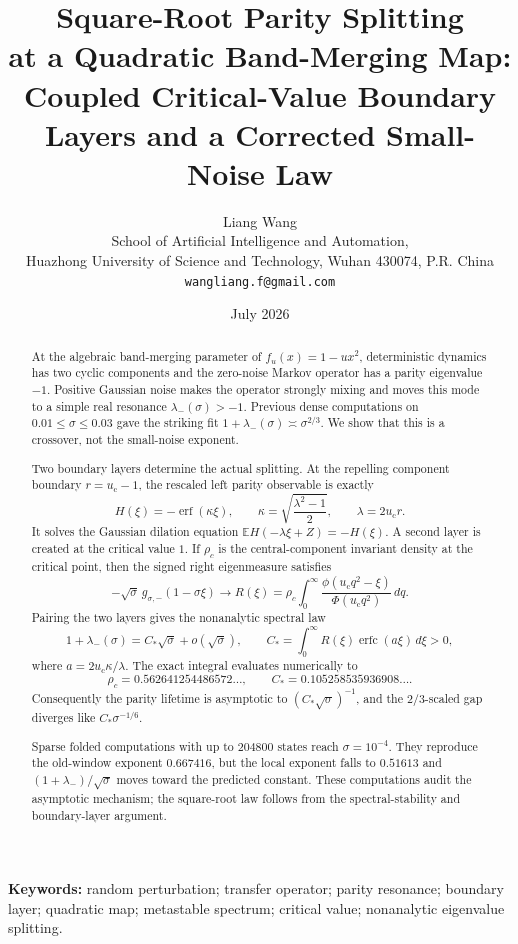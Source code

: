 \documentclass[11pt]{article}
\title{\textbf{Square-Root Parity Splitting}\\
\textbf{at a Quadratic Band-Merging Map:}\\[0.35em]
\large Coupled Critical-Value Boundary Layers and a Corrected Small-Noise Law}
\author{Liang Wang\\
\small School of Artificial Intelligence and Automation,\\[-0.2em]
\small Huazhong University of Science and Technology, Wuhan 430074, P.R. China\\
\small \texttt{wangliang.f@gmail.com}}
\date{July 2026}
\theoremstyle{definition}
\theoremstyle{remark}
\newcommand{\erfop}{\operatorname{erf}}
\newcommand{\erfcop}{\operatorname{erfc}}
\begin{document}
\maketitle

\begin{abstract}
At the algebraic band-merging parameter of $f_u(x)=1-u x^2$, deterministic
dynamics has two cyclic components and the zero-noise Markov operator has a
parity eigenvalue $-1$.  Positive Gaussian noise makes the operator strongly
mixing and moves this mode to a simple real resonance
$\lambda_-(\sigma)>-1$.  Previous dense computations on
$0.01\le\sigma\le0.03$ gave the striking fit
$1+\lambda_-(\sigma)\asymp\sigma^{2/3}$.  We show that this is a crossover,
not the small-noise exponent.

Two boundary layers determine the actual splitting.  At the repelling
component boundary $r=u_{\mathrm c}-1$, the rescaled left parity observable
is exactly
\[
 H(\xi)=-\erfop(\kappa\xi),
 \qquad
 \kappa=\sqrt{\frac{\lambda^2-1}{2}},
 \qquad
 \lambda=2u_{\mathrm c}r.
\]
It solves the Gaussian dilation equation
$\mathbb E H(-\lambda\xi+Z)=-H(\xi)$.  A second layer is created at the
critical value $1$.  If $\rho_c$ is the central-component invariant density
at the critical point, then the signed right eigenmeasure satisfies
\[
 -\sqrt\sigma\,g_{\sigma,-}(1-\sigma\xi)\longrightarrow
 R(\xi)
 =\rho_c\int_0^\infty
 \frac{\phi(u_{\mathrm c}q^2-\xi)}{\Phi(u_{\mathrm c}q^2)}\,dq.
\]
Pairing the two layers gives the nonanalytic spectral law
\[
 \boxed{
  1+\lambda_-(\sigma)=C_*\sqrt\sigma+o(\sqrt\sigma)},
 \qquad
 C_*=\int_0^\infty R(\xi)\erfcop(a\xi)\,d\xi>0,
\]
where $a=2u_{\mathrm c}\kappa/\lambda$.  The exact integral evaluates
numerically to
\[
 \rho_c=0.562641254486572\ldots,
 \qquad
 C_*=0.105258535936908\ldots.
\]
Consequently the parity lifetime is asymptotic to
$(C_*\sqrt\sigma)^{-1}$, and the $2/3$-scaled gap diverges like
$C_*\sigma^{-1/6}$.

Sparse folded computations with up to $204800$ states reach
$\sigma=10^{-4}$.  They reproduce the old-window exponent $0.667416$, but
the local exponent falls to $0.51613$ and
$(1+\lambda_-)/\sqrt\sigma$ moves toward the predicted constant.  These
computations audit the asymptotic mechanism; the square-root law follows from
the spectral-stability and boundary-layer argument.
\end{abstract}

\noindent\textbf{Keywords:} random perturbation; transfer operator; parity
resonance; boundary layer; quadratic map; metastable spectrum; critical
value; nonanalytic eigenvalue splitting.
\end{document}
